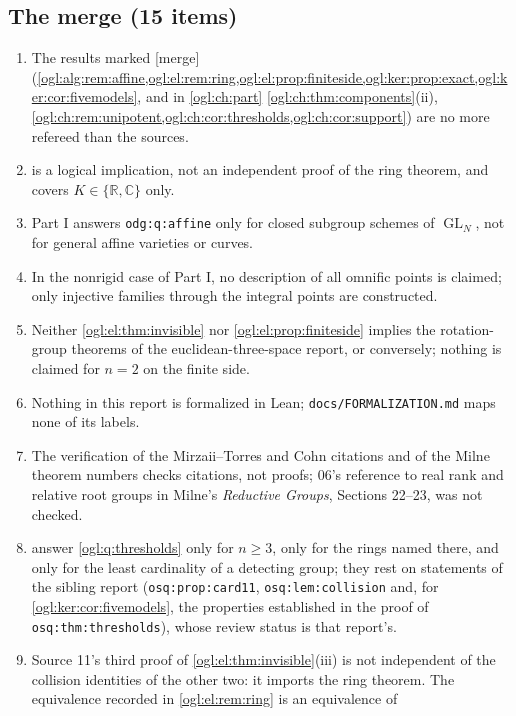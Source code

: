 \documentclass[11pt,oneside]{article}
\numberwithin{equation}{section}
\theoremstyle{definition}
\theoremstyle{remark}
\newcommand{\R}{\mathbb R}
\newcommand{\C}{\mathbb C}
\newcommand{\GL}{\operatorname{GL}}
\newcommand{\mergetag}{\textup{\textsf{\small[merge]}}}
\newcommand{\replabel}[1]{\nolinkurl{#1}}
\newcommand{\fn}[1]{\nolinkurl{#1}}
\begin{document}
\subsection{The merge (15 items)}
\begin{enumerate}[leftmargin=*,widest=00,label=M.\arabic*]
\item The results marked \mergetag{}
(\cref{ogl:alg:rem:affine,ogl:el:rem:ring,ogl:el:prop:finiteside,ogl:ker:prop:exact,ogl:ker:cor:fivemodels},
and in \cref{ogl:ch:part} \cref{ogl:ch:thm:components}(ii),
\cref{ogl:ch:rem:unipotent,ogl:ch:cor:thresholds,ogl:ch:cor:support})
are no more refereed than the sources.
\item {} is a logical implication, not an independent proof
of the ring theorem, and covers $K\in\{\R,\C\}$ only.
\item Part I answers \replabel{odg:q:affine} only for closed subgroup schemes of
$\GL_N$, not for general affine varieties or curves.
\item In the nonrigid case of Part I, no description of all omnific points is
claimed; only injective families through the integral points are constructed.
\item Neither \cref{ogl:el:thm:invisible} nor \cref{ogl:el:prop:finiteside}
implies the rotation-group theorems of the euclidean-three-space report, or
conversely; nothing is claimed for $n=2$ on the finite side.
\item Nothing in this report is formalized in Lean; \fn{docs/FORMALIZATION.md}
maps none of its labels.
\item The verification of the Mirzaii--Torres and Cohn citations and of the Milne
theorem numbers checks citations, not proofs; 06's reference to real rank and
relative root groups in Milne's \emph{Reductive Groups}, Sections 22--23, was not
checked.
\item {} answer
\cref{ogl:q:thresholds} only for $n\ge3$, only for the rings named there, and only
for the least cardinality of a detecting group; they rest on statements of the
sibling report (\replabel{osq:prop:card11}, \replabel{osq:lem:collision} and,
for \cref{ogl:ker:cor:fivemodels}, the properties established in the proof of
\replabel{osq:thm:thresholds}), whose review status is that report's.
\item Source 11's third proof of \cref{ogl:el:thm:invisible}(iii) is not
independent of the collision identities of the other two: it imports the ring
theorem. The equivalence recorded in \cref{ogl:el:rem:ring} is an equivalence of

\end{enumerate}
\end{document}
